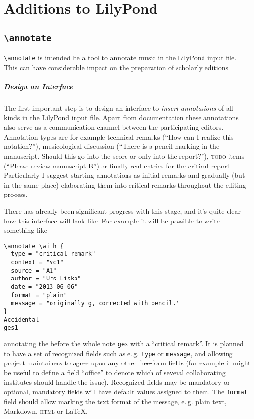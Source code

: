 \documentclass[oneside]{OLLbook}
\begin{document}
\tableofcontents

\chapter{Additions to LilyPond}

\section{\texttt{\textbackslash annotate}}\label{sec:annotate}
\texttt{\textbackslash annotate} is intended be a tool to annotate music in the LilyPond input file.
This can have considerable impact on the preparation of scholarly editions.

\paragraph{Design an Interface}
The first important step is to design an interface to \emph{insert annotations} of all kinds in the LilyPond input file.
Apart from documentation these annotations also serve as a communication channel between the participating editors.
Annotation types are for example technical remarks 
(“How can I realize this notation?”), 
musicological discussion 
(“There is a pencil marking in the manuscript.
Should this go into the score or only into the report?”),
\textsc{todo} items
(“Please review manuscript B”)
or finally real entries for the critical report.
Particularly I suggest starting annotations as initial remarks and gradually (but in the same place) elaborating them into critical remarks throughout the editing process.

There has already been significant progress with this stage, and it's quite clear how this interface will look like.
For example it will be possible to write something like

\begin{verbatim}\annotate \with {
  type = "critical-remark"
  context = "vc1"
  source = "A1"
  author = "Urs Liska"
  date = "2013-06-06"
  format = "plain"
  message = "originally g, corrected with pencil."
}
Accidental
ges1--
\end{verbatim}

\noindent annotating the \flat{} before the whole note \texttt{ges} with a “critical remark”.
It is planned to have a set of recognized fields such as e.\,g. \texttt{type} or \texttt{message}, and allowing project maintainers to agree upon any other free-form fields (for example it might be useful to define a field “office” to denote which of several collaborating institutes should handle the issue).
Recognized fields may be mandatory or optional, mandatory fields will have default values assigned to them.
The \texttt{format} field should allow marking the text format of the message, e.\,g. plain text, Markdown, \textsc{html} or \LaTeX.
\end{document}
